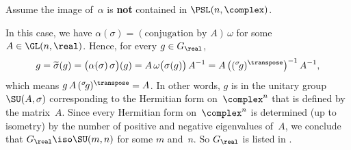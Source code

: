 \begin{case} \label{RFormSLOuterCase}
Assume the image of~$\alpha$ is \textbf{not} contained in $\PSL(n,\complex)$.
\end{case}
%
In this case, we have $\alpha(\sigma) = (\text{conjugation~by~$A$}) \, \omega$ for some $A \in \GL(n,\real)$. Hence, for every $g \in G_\real$, 
	$$g = \widetilde\sigma(g) 
	=  \bigl( \alpha(\sigma) \, \sigma\bigr) (g) 
	= A \, \omega \bigl( \sigma(g) \bigr) \, A^{-1}
	= A \, \bigl( ({}^{\sigma} \! g)^\transpose \bigr) ^{-1} \, A^{-1} ,$$
which means $g \, A \, ({}^{\sigma} \! g)^\transpose = A$. In other words, $g$ is in the unitary group  $\SU( A, \sigma)$ corresponding to the Hermitian form on~$\complex^n$ that is defined by the matrix~$A$. Since every Hermitian form on~$\complex^n$ is determined (up to isometry) by the number of positive and negative eigenvalues of~$A$, we conclude that $G_{\real} \iso \SU(m,n)$ for some $m$ and~$n$. So $G_\real$ is listed in .



